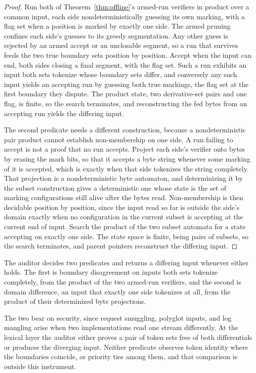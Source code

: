 \documentclass[11pt,a4paper]{article}
\theoremstyle{definition}
\theoremstyle{plain}
\begin{document}
\begin{proof}
Run both of Theorem~\ref{thm:offline}'s armed-run verifiers in product over a common input, each side
nondeterministically guessing its own marking, with a flag set when a position is marked by exactly one side. The armed
pruning confines each side's guesses to its greedy segmentation. Any other guess is rejected by an armed accept or an
unclosable segment, so a run that survives feeds the two true boundary sets position by position. Accept when the input
can end, both sides closing a final segment, with the flag set. Such a run exhibits an input both sets tokenize whose
boundary sets differ, and conversely any such input yields an accepting run by guessing both true markings, the flag set
at the first boundary they dispute. The product state, two derivative-set pairs and one flag, is finite, so the search
terminates, and reconstructing the fed bytes from an accepting run yields the differing input.

The second predicate needs a different construction, because a nondeterministic pair product cannot establish
non-membership on one side. A run failing to accept is not a proof that no run accepts. Project each side's verifier
onto bytes by erasing the mark bits, so that it accepts a byte string whenever some marking of it is accepted, which is
exactly when that side tokenizes the string completely. That projection is a nondeterministic byte automaton, and
determinizing it by the subset construction gives a deterministic one whose state is the set of marking configurations
still alive after the bytes read. Non-membership is then decidable position by position, since the input read so far is
outside the side's domain exactly when no configuration in the current subset is accepting at the current end of input.
Search the product of the two subset automata for a state accepting on exactly one side. The state space is finite,
being pairs of subsets, so the search terminates, and parent pointers reconstruct the differing input.
\end{proof}

The auditor decides two predicates and returns a differing input whenever either holds. The first is boundary
disagreement on inputs both sets tokenize completely, from the product of the two armed-run verifiers, and the second is
domain difference, an input that exactly one side tokenizes at all, from the product of their determinized byte
projections.

The two bear on security, since request smuggling, polyglot inputs, and log mangling arise when two implementations read
one stream differently. At the lexical layer the auditor either proves a pair of token sets free of both differentials
or produces the diverging input. Neither predicate observes token identity where the boundaries coincide, or priority
ties among them, and that comparison is outside this instrument.
\end{document}
